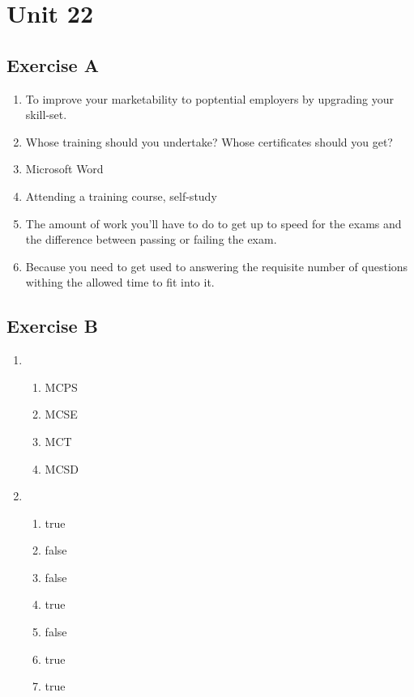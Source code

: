 \documentclass[a5paper,10pt,notitlepage,pdftex,headsepline]{scrartcl}
\begin{document}
\section{Unit 22}
  \subsection{Exercise A}
    \begin{enumerate}
      \item To improve your marketability to poptential employers by upgrading
        your skill-set.
      \item Whose training should you undertake?
        Whose certificates should you get?
      \item Microsoft Word
      \item Attending a training course, self-study
      \item The amount of work you'll have to do to get up to speed for the
        exams and the difference between passing or failing the exam.
      \item Because you need to get used to answering the requisite number of
        questions withing the allowed time to fit into it.
    \end{enumerate}
  \subsection{Exercise B}
    \begin{enumerate}
      \item \begin{enumerate}
          \item MCPS
          \item MCSE
          \item MCT
          \item MCSD
        \end{enumerate}
      \item \begin{enumerate}
          \item true
          \item false
          \item false
          \item true
          \item false
          \item true
          \item true
        \end{enumerate}
    \end{enumerate}
\end{document}
